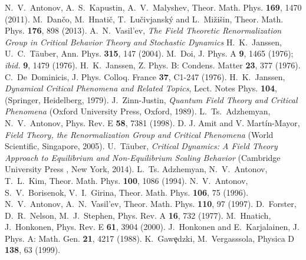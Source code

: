 \begin{thebibliography}{99}
  N.~V.~Antonov, A.~S.~Kapustin, A.~V.~Malyshev, Theor. Math. Phys. {\bf 169}, 1470 (2011).
  M.~Dan\v{c}o, M.~Hnati\v{c}, T.~Lu\v{c}ivjansk\'{y} and L.~Mi\v{z}i\v{s}in, Theor. Math. Phys. {\bf 176}, 898 (2013).
  A.~N.~Vasil'ev, {\it The Field Theoretic Renormalization Group in Critical Behavior Theory and Stochastic Dynamics}
  H.~K.~Janssen, U.~C.~T{\"a}uber, Ann. Phys. {\bf 315}, 147 (2004).
  M.~Doi, J. Phys. A {\bf 9}, 1465 (1976); {\it ibid.} {\bf 9}, 1479 (1976).        
  H.~K.~Janssen, Z. Phys. B: Condens. Matter {\bf 23}, 377 (1976).
  C.~De~Dominicis, J. Phys. Colloq. France {\bf 37}, C1-247 (1976).
  H.~K.~Janssen, {\it Dynamical Critical Phenomena and Related Topics},
    Lect. Notes Phys. {\bf 104}, (Springer, Heidelberg, 1979).
  J.~Zinn-Justin, \textit{Quantum Field Theory and Critical Phenomena} (Oxford University Press, Oxford, 1989).   
  L.~Ts.~Adzhemyan, N.~V.~Antonov, Phys. Rev. E {\bf 58}, 7381 (1998).   
  D. J. Amit and V. Mart\'in-Mayor, {\it Field Theory, the Renormalization Group and Critical Phenomena}
 (World Scientific, Singapore, 2005). 
  U.~T{\"a}uber, {\it Critical Dynamics: A Field Theory Approach to Equilibrium
 	      and Non-Equilibrium Scaling Behavior}
 	      (Cambridge University Press , New York, 2014).
  L.~Ts. Adzhemyan, N.~V.~Antonov, T.~L.~Kim, Theor. Math. Phys. {\bf 100}, 1086 (1994).
  N.~V.~Antonov, S.~V.~Borisenok, V.~I.~Girina, Theor. Math. Phys. {\bf 106}, 75 (1996).
  N.~V.~Antonov, A.~N.~Vasil'ev, Theor. Math. Phys. {\bf 110}, 97 (1997).
  D.~Forster, D.~R.~Nelson, M.~J.~Stephen, Phys. Rev. A {\bf 16}, 732 (1977).
  M.~Hnatich, J.~Honkonen, Phys. Rev. E {\bf 61}, 3904 (2000).
  J.~Honkonen and E.~Karjalainen, J. Phys. A: Math. Gen. {\bf 21}, 4217 (1988). 
  K.~Gaw{\c{e}}dzki, M.~Vergasssola, Physica D {\bf 138}, 63 (1999).
\end{thebibliography}
